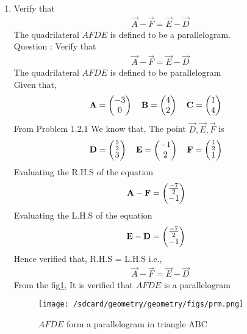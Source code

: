 \documentclass[11pt]{book}
\begin{document}
\begin{enumerate}[label=\thesection.\arabic*.,ref=\thesection.\theenumi]
\item Verify that 
		\begin{align}
\vec{A}-\vec{F}=\vec{E}-\vec{D}
		\end{align}
The quadrilateral $AFDE$ is defined to be a parallelogram.\\
Question : Verify that 
\begin{align}
	\vec{A}-\vec{F} = \vec{E}-\vec{D}
\end{align}
The quadrilateral $AFDE$ is defined to be parallelogram
\\ \solution 
Given that,
\begin{align}
    \mathbf{A} = \begin{pmatrix}-3\\0\end{pmatrix}
    \quad
    \mathbf{B} &= \begin{pmatrix}4\\2\end{pmatrix}
    \quad
    \mathbf{C} = \begin{pmatrix}1\\4\end{pmatrix}
\end{align}
From Problem 1.2.1 We know that, The point $\vec{D},\vec{E},\vec{F}$ is 
\begin{align}
    \mathbf{D} = \begin{pmatrix}\frac{5}{2}\\ 3 \end{pmatrix}
    \quad
    \mathbf{E} &= \begin{pmatrix}-1\\2\end{pmatrix}
    \quad
    \mathbf{F} = \begin{pmatrix}\frac{1}{2}\\ 1\end{pmatrix}
\end{align}
Evaluating the R.H.S of the equation
\begin{align}
    \mathbf{A}-\mathbf{F}&=\begin{pmatrix} \frac{-7}{2} \\ -1 \end{pmatrix}
\end{align} 
Evaluating the L.H.S of the equation
\begin{align}
    \mathbf{E}-\mathbf{D}&=\begin{pmatrix}\frac{-7}{2} \\ -1 \end{pmatrix}
\end{align}
Hence verified that, R.H.S = L.H.S i.e.,
\begin{align}
	\vec{A}-\vec{F} = \vec{E}-\vec{D}
\end{align}
From the fig\ref{fig:Triangle}, It is verified that $AFDE$ is a parallelogram
\begin{figure}
\centering
\texttt{[image: /sdcard/geometry/geometry/figs/prm.png]}
\caption{$AFDE$ form a parallelogram in triangle ABC}
\label{fig:Triangle}
\end{figure}
\end{enumerate}














%
\end{document}
